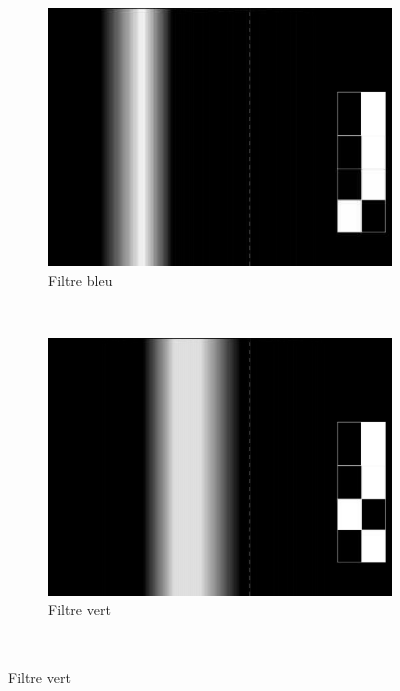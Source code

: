 \begin{itemize}
\begin{figure}[H]
					    \begin{subfigure}[h]{0.3\textwidth}
					        \includegraphics[width=\textwidth]{Graphics/opencvB.jpg}
					        \caption{Filtre bleu}
					    \end{subfigure}
					    ~ %
					    \begin{subfigure}[h]{0.3\textwidth}
					        \includegraphics[width=\textwidth]{Graphics/opencvG.jpg}
					        \caption{Filtre vert}
					    \end{subfigure}
					    ~ %

\end{figure}
\end{itemize}
